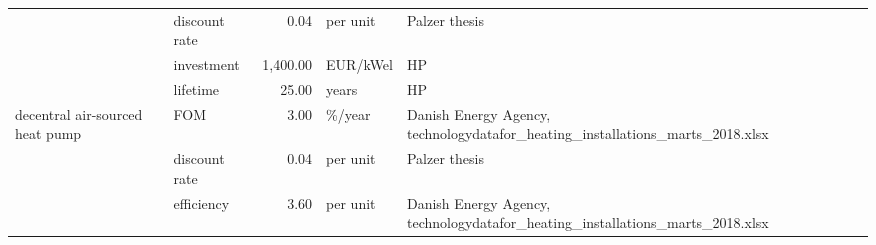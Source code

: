 \begin{longtable}{p{5cm}p{3cm}rp{3cm}p{11cm}}
                      & discount rate &           0.04 &                          per unit &                                                                                                                                                                                                                                                                                                                        Palzer thesis \\
                      & investment &       1,400.00 &                          EUR/kWel &                                                                                                                                                                                                                                                                                                                                   HP \\
                      & lifetime &          25.00 &                             years &                                                                                                                                                                                                                                                                                                                                   HP \\
decentral air-sourced heat pump & FOM &           3.00 &                            \%/year &                                                                                                                                                                                                                                                        Danish Energy Agency, technologydatafor\_heating\_installations\_marts\_2018.xlsx \\
                      & discount rate &           0.04 &                          per unit &                                                                                                                                                                                                                                                                                                                        Palzer thesis \\
                      & efficiency &           3.60 &                          per unit &                                                                                                                                                                                                                                                        Danish Energy Agency, technologydatafor\_heating\_installations\_marts\_2018.xlsx \\

\end{longtable}
